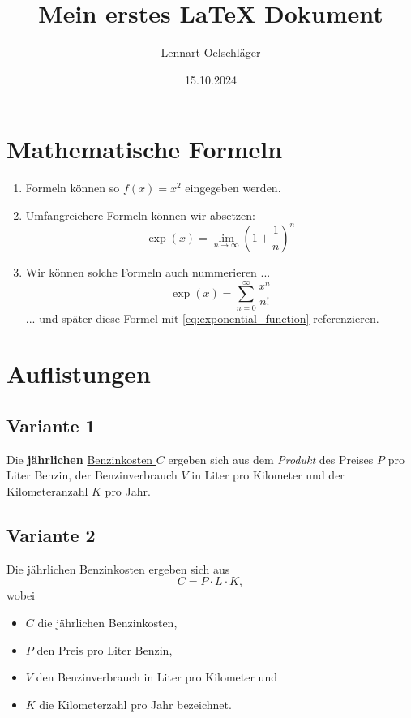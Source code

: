 \documentclass{article}
\title{Mein erstes LaTeX Dokument}
\author{Lennart Oelschläger}
\date{15.10.2024}
\begin{document}
\maketitle

\section{Mathematische Formeln}

\begin{enumerate}
    \item Formeln können so $f(x) = x^2$ eingegeben werden. 
    \item Umfangreichere Formeln können wir absetzen:
    $$ \exp(x) =  \lim_{n \to \infty} \left( 1 + \frac{1}{n} \right)^n $$
    \item Wir können solche Formeln auch nummerieren ...
    \begin{equation}
        \label{eq:exponential_function}
        \exp(x) = \sum_{n = 0}^\infty \frac{x^n}{n!}
    \end{equation}
    ... und später diese Formel mit \eqref{eq:exponential_function} referenzieren.
\end{enumerate}

\section{Auflistungen}

\subsection{Variante 1}

Die \textbf{jährlichen} \underline{Benzinkosten $C$} ergeben sich aus dem \textit{Produkt} des Preises $P$ pro Liter Benzin, der Benzinverbrauch $V$ in Liter pro Kilometer und der Kilometeranzahl $K$ pro Jahr.

\subsection{Variante 2}

Die jährlichen Benzinkosten ergeben sich aus $$ C = P \cdot L \cdot K, $$ wobei

\begin{itemize}
    \item $C$ die jährlichen Benzinkosten,
    \item $P$ den Preis pro Liter Benzin,
    \item $V$ den Benzinverbrauch in Liter pro Kilometer und
    \item $K$ die Kilometerzahl pro Jahr bezeichnet.
\end{itemize}
\end{document}
